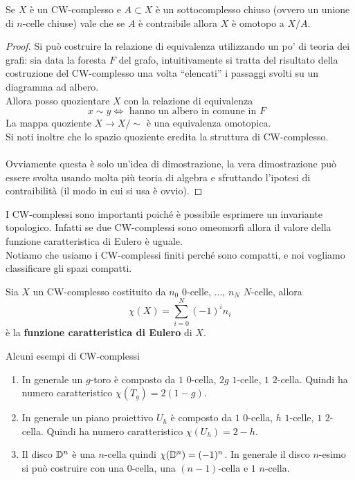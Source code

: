 \begin{theorem}
	\label{thr:contrai_ncelle_cw_complesso}
	Se $X$ è un CW-complesso e $A \subset X$ è un sottocomplesso chiuso (ovvero un unione di $n$-celle chiuse) vale che se $A$ è contraibile allora $X$ è omotopo a $X / A$.
\end{theorem}
\begin{proof}
	Si può costruire la relazione di equivalenza utilizzando un po' di teoria dei grafi: sia data la foresta $F$ del grafo, intuitivamente si tratta del risultato della costruzione del CW-complesso una volta \enquote{elencati} i passaggi svolti su un diagramma ad albero. \\ Allora posso quozientare $X$ con la relazione di equivalenza
	\begin{equation*}
	x \sim y \iff \text{ hanno un albero in comune in $F$ }
	\end{equation*}
	La mappa quoziente $X \to X/\sim$ è una equivalenza omotopica. \\ Si noti inoltre che lo spazio quoziente eredita la struttura di CW-complesso. \\ \\ Ovviamente questa è solo un'idea di dimostrazione, la vera dimostrazione può essere svolta usando molta più teoria di algebra e sfruttando l'ipotesi di contraibilità (il modo in cui si usa è ovvio).
\end{proof}

I CW-complessi sono importanti poiché è possibile esprimere un invariante topologico. Infatti se due CW-complessi sono omeomorfi allora il valore della funzione caratteristica di Eulero è uguale. \\ Notiamo che usiamo i CW-complessi finiti perché sono compatti, e noi vogliamo classificare gli spazi compatti.

\begin{definition}
	Sia $X$ un CW-complesso costituito da $n_0$ $0$-celle, $\dots$, $n_N$ $N$-celle, allora 
	\begin{equation*}
		\chi(X) = \sum_{i=0}^{N} (-1)^i n_i
	\end{equation*}
	è la \textbf{funzione caratteristica di Eulero} di $X$. 
\end{definition}

\begin{remark}
	Alcuni esempi di CW-complessi
	\begin{enumerate}
		\item In generale un $g$-toro è composto da $1$ $0$-cella, $2g$ $1$-celle, $1$ $2$-cella. Quindi ha numero caratteristico $\chi(T_g) = 2(1-g)$. 
		\item In generale un piano proiettivo $U_h$ è composto da $1$ $0$-cella, $h$ $1$-celle, $1$ $2$-cella. Quindi ha numero caratteristico $\chi(U_h) = 2 - h$.
		\item Il disco $\mathbb{D}^n$ è una $n$-cella quindi $\chi(\mathbb{D}^n) = (-1)^n$. In generale il disco $n$-esimo si può costruire con una $0$-cella, una $(n-1)$-cella e $1$ $n$-cella.
	\end{enumerate}
\end{remark}

